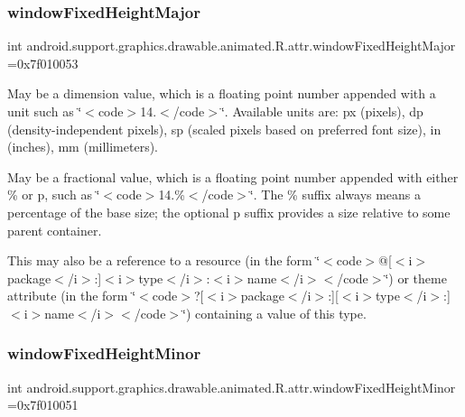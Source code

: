 \subsubsection{\texorpdfstring{window\+Fixed\+Height\+Major}{windowFixedHeightMajor}}
{\footnotesize\ttfamily int android.\+support.\+graphics.\+drawable.\+animated.\+R.\+attr.\+window\+Fixed\+Height\+Major =0x7f010053\hspace{0.3cm}{\ttfamily [static]}}

May be a dimension value, which is a floating point number appended with a unit such as \char`\"{}$<$code$>$14.\+5sp$<$/code$>$\char`\"{}. Available units are\+: px (pixels), dp (density-\/independent pixels), sp (scaled pixels based on preferred font size), in (inches), mm (millimeters). 

May be a fractional value, which is a floating point number appended with either \% or p, such as \char`\"{}$<$code$>$14.\%$<$/code$>$\char`\"{}. The \% suffix always means a percentage of the base size; the optional p suffix provides a size relative to some parent container. 

This may also be a reference to a resource (in the form \char`\"{}$<$code$>$@\mbox{[}$<$i$>$package$<$/i$>$\+:\mbox{]}$<$i$>$type$<$/i$>$\+:$<$i$>$name$<$/i$>$$<$/code$>$\char`\"{}) or theme attribute (in the form \char`\"{}$<$code$>$?\mbox{[}$<$i$>$package$<$/i$>$\+:\mbox{]}\mbox{[}$<$i$>$type$<$/i$>$\+:\mbox{]}$<$i$>$name$<$/i$>$$<$/code$>$\char`\"{}) containing a value of this type. \mbox{\label{classandroid_1_1support_1_1graphics_1_1drawable_1_1animated_1_1R_1_1attr_a09c84c88c489f1c3cae7d527c75c6e77}} 
\subsubsection{\texorpdfstring{window\+Fixed\+Height\+Minor}{windowFixedHeightMinor}}
{\footnotesize\ttfamily int android.\+support.\+graphics.\+drawable.\+animated.\+R.\+attr.\+window\+Fixed\+Height\+Minor =0x7f010051\hspace{0.3cm}{\ttfamily [static]}}

